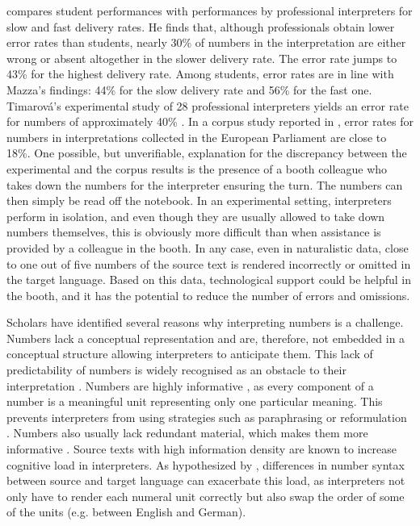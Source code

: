 \documentclass[output=paper]{langsci/langscibook}
\begin{document}
\citet{Korpal2016} compares student performances with performances by professional interpreters for slow and fast delivery rates. He finds that, although professionals obtain lower error rates than students, nearly 30\% of numbers in the interpretation are either wrong or absent altogether in the slower delivery rate. The error rate jumps to 43\% for the highest delivery rate. Among students, error rates are in line with Mazza’s findings: 44\% for the slow delivery rate and 56\% for the fast one. Timarová’s experimental study of 28 professional interpreters yields an error rate for numbers of approximately 40\% \citep{Timarova2012}. In a corpus study reported in \citet{Collard2017}, error rates for numbers in interpretations collected in the European Parliament are close to 18\%. One possible, but unverifiable, explanation for the discrepancy between the experimental and the corpus results is the presence of a booth colleague who takes down the numbers for the interpreter ensuring the turn. The numbers can then simply be read off the notebook. In an experimental setting, interpreters perform in isolation, and even though they are usually allowed to take down numbers themselves, this is obviously more difficult than when assistance is provided by a colleague in the booth. In any case, even in naturalistic data, close to one out of five numbers of the source text is rendered incorrectly or omitted in the target language. Based on this data, technological support could be helpful in the booth, and it has the potential to reduce the number of errors and omissions.

Scholars have identified several reasons why interpreting numbers is a challenge. Numbers lack a conceptual representation \citep{Timarova2012,Seeber2015} and are, therefore, not embedded in a conceptual structure allowing interpreters to anticipate them. This lack of predictability of numbers is widely recognised as an obstacle to their interpretation \citep{Braun1996,Mazza2001,Pinochi2009,Mead2015}. Numbers are highly informative \citep{Alessandrini1990}, as every component of a number is a meaningful unit representing only one particular meaning. This prevents interpreters from using strategies such as paraphrasing or reformulation \citep{Pinochi2009}. Numbers also usually lack redundant material, which makes them more informative \citep{Gile1995,Seeber2015}. Source texts with high information density are known to increase cognitive load in interpreters. As hypothesized by \citet{Pinochi2009}, differences in number syntax between source and target language can exacerbate this load, as interpreters not only have to render each numeral unit correctly but also swap the order of some of the units (e.g. between English and German).
\end{document}
